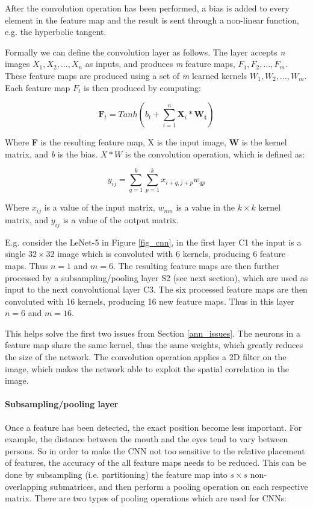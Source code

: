 After the convolution operation has been performed, a bias is added to every element in the feature map and the result is sent through a non-linear function, e.g. the hyperbolic tangent.

Formally we can define the convolution layer as follows. The layer accepts \textit{n} images $ X_1, X_2, \dots, X_n $ as inputs, and produces \textit{m} feature maps, $F_1, F_2, \dots, F_m $. These feature maps are produced using a set of \textit{m} learned kernels $ W_1, W_2, \dots, W_m $.  Each feature map $ F_t $ is then produced by computing:
 

\begin{equation}
\mathbf{F}_t = Tanh(b_t+\sum_{i=1}^{n}\mathbf{X}_i*\mathbf{W_t})
\end{equation}

Where \textbf{F} is the resulting feature map, X is the input image, \textbf{W} is the kernel matrix, and \textit{b} is the bias. $ X * W $ is the convolution operation, which is defined as:

\begin{equation}
y_{ij} = \sum_{q=1}^{k}\sum_{p=1}^{k} x_{i+q, j+p}w_{qp}
\end{equation}

Where $ x_{ij} $ is a value of the input matrix, $ w_{mn} $ is a value in the $ k \times k $ kernel matrix, and $ y_{ij} $ is a value of the output matrix.

E.g. consider the LeNet-5 in Figure \ref{fig_cnn}, in the first layer C1 the input is a single $ 32 \times 32 $ image which is convoluted with 6 kernels, producing 6 feature maps. Thus $ n = 1 $ and $ m = 6 $. The resulting feature maps are then further processed by a subsampling/pooling layer S2 (see next section), which are used as input to the next convolutional layer C3. The six processed feature maps are then convoluted with 16 kernels, producing 16 new feature maps. Thus in this layer $ n = 6 $ and $ m = 16 $. 



This helps solve the first two issues from Section \ref{ann_issues}. The neurons in a feature map share the same kernel, thus the same weights, which greatly reduces the size of the network. The convolution operation applies a 2D filter on the image, which makes the network able to exploit the spatial correlation in the image. 

\paragraph{Subsampling/pooling layer}  \hfill \break
Once a feature has been detected, the exact position become less important. For example, the distance between the mouth and the eyes tend to vary between persons. So in order to make the CNN not too sensitive to the relative placement of features, the accuracy of the all feature maps needs to be reduced. This can be done by subsampling (i.e. partitioning) the feature map into $ s \times s $ non-overlapping submatrices, and then perform a pooling operation on each respective matrix. There are two types of pooling operations which are used for CNNs: 

